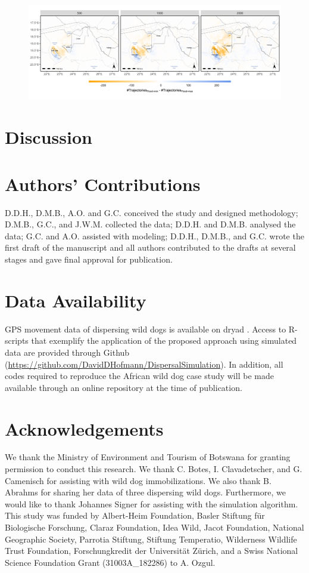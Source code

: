 \documentclass[abstract=on,10pt,a4paper,bibliography=totocnumbered]{article}
\begin{document}
\begin{figure}
  \begin{center}
  \includegraphics[width = \textwidth]{99_DifferenceHeatmaps.png}
  \caption{}
  \label{DifferenceHeatmaps}
  \end{center}
\end{figure}

\section{Discussion}


\section{Authors' Contributions}
D.D.H., D.M.B., A.O. and G.C. conceived the study and designed methodology;
D.M.B., G.C., and J.W.M. collected the data; D.D.H. and D.M.B. analysed the
data; G.C. and A.O. assisted with modeling; D.D.H., D.M.B., and G.C. wrote the
first draft of the manuscript and all authors contributed to the drafts at
several stages and gave final approval for publication.

\section{Data Availability}
GPS movement data of dispersing wild dogs is available on dryad
\citep{Hofmann.2021b}. Access to R-scripts that exemplify the application of the
proposed approach using simulated data are provided through Github
(\url{https://github.com/DavidDHofmann/DispersalSimulation}). In addition, all
codes required to reproduce the African wild dog case study will be made
available through an online repository at the time of publication.

\section{Acknowledgements}
We thank the Ministry of Environment and Tourism of Botswana for granting
permission to conduct this research. We thank C. Botes, I. Clavadetscher, and G.
Camenisch for assisting with wild dog immobilizations. We also thank B. Abrahms
for sharing her data of three dispersing wild dogs. Furthermore, we would like
to thank Johannes Signer for assisting with the simulation algorithm. This study
was funded by Albert-Heim Foundation, Basler Stiftung für Biologische Forschung,
Claraz Foundation, Idea Wild, Jacot Foundation, National Geographic Society,
Parrotia Stiftung, Stiftung Temperatio, Wilderness Wildlife Trust Foundation,
Forschungkredit der Universität Zürich, and a Swiss National Science Foundation
Grant (31003A\_182286) to A. Ozgul.

\newpage
\begingroup
\singlespacing

\endgroup
\end{document}
